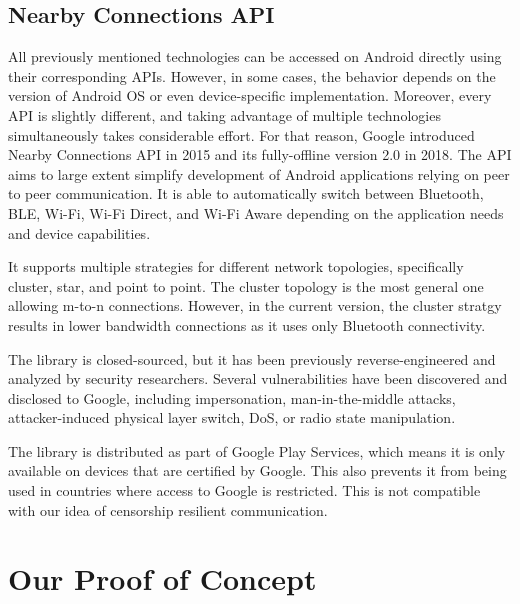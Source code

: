 \documentclass[conference,compsoc]{IEEEtran}
\begin{document}

\subsection{Nearby Connections API}

All previously mentioned technologies can be accessed on Android directly using their corresponding APIs. However, in some cases, the behavior depends on the version of Android OS or even device-specific implementation. Moreover, every API is slightly different, and taking advantage of multiple technologies simultaneously takes considerable effort. For that reason, Google introduced Nearby Connections API in 2015 and its fully-offline version 2.0 in 2018. \cite{nearby2} The API aims to large extent simplify development of Android applications relying on peer to peer communication. It is able to automatically switch between Bluetooth, BLE, Wi-Fi, Wi-Fi Direct, and Wi-Fi Aware depending on the application needs and device capabilities.

It supports multiple strategies for different network topologies, specifically cluster, star, and point to point. The cluster topology is the most general one allowing m-to-n connections. However, in the current version, the cluster stratgy results in lower bandwidth connections as it uses only Bluetooth connectivity.

The library is closed-sourced, but it has been previously reverse-engineered and analyzed by security researchers. Several vulnerabilities have been discovered and disclosed to Google, including impersonation, man-in-the-middle attacks, attacker-induced physical layer switch, DoS, or radio state manipulation. \cite{nearbytr}

The library is distributed as part of Google Play Services, which means it is only available on devices that are certified by Google. This also prevents it from being used in countries where access to Google is restricted. This is not compatible with our idea of censorship resilient communication.


\section{Our Proof of Concept} \label{poc}
\end{document}
